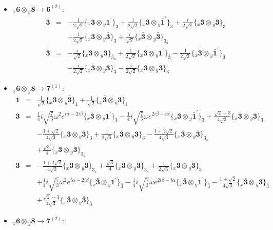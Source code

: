 \documentclass[english]{article}
\newcommand{\rep}[1]{\mathbf{#1}}
\newcommand{\repx}[2]{{}_{#2}\mathbf{#1}}
\newcommand{\subcg}[3]{\big\{ \repx{#1}{x}\otimes\repx{#2}{y}\big\}^{}_{#3}}
\begin{document}
\begin{itemize}
\begin{eqnarray*}
\end{eqnarray*}
\item $\repx{6}{x}\otimes\repx{8}{y}\to\rep{6}^{(2)}$:
\begin{eqnarray*}
\rep{3} &=& -\frac{1}{2 \sqrt{2}}\subcg{3}{1^{\prime}}{3}+\frac{1}{2 \sqrt{2}}\subcg{3}{\bar{1}^{\prime}}{3}+\frac{i}{2 \sqrt{2}}\subcg{3}{3}{3} \\ 
 & & +\frac{i}{2 \sqrt{2}}\subcg{3}{\bar{3}}{3}+\frac{i}{\sqrt{2}}\subcg{\bar{3}}{\bar{3}}{3_{a}}
\\
\rep{\bar{3}} &=& -\frac{i}{\sqrt{2}}\subcg{3}{3}{\bar{3}_{a}}+\frac{1}{2 \sqrt{2}}\subcg{\bar{3}}{1^{\prime}}{\bar{3}}-\frac{1}{2 \sqrt{2}}\subcg{\bar{3}}{\bar{1}^{\prime}}{\bar{3}} \\ 
 & & -\frac{i}{2 \sqrt{2}}\subcg{\bar{3}}{3}{\bar{3}}-\frac{i}{2 \sqrt{2}}\subcg{\bar{3}}{\bar{3}}{\bar{3}}
\end{eqnarray*}
\item $\repx{6}{x}\otimes\repx{8}{y}\to\rep{7}^{(1)}$:
\begin{eqnarray*}
\rep{1} &=& \frac{1}{\sqrt{2}}\subcg{3}{\bar{3}}{1}+\frac{1}{\sqrt{2}}\subcg{\bar{3}}{3}{1}
\\
\rep{3} &=& \frac{1}{4} i \sqrt{\frac{7}{3}} \omega ^2 e^{i \alpha -2 i \beta }\subcg{3}{1^{\prime}}{3}-\frac{1}{4} i \sqrt{\frac{7}{3}} \omega  e^{2 i \beta -i \alpha }\subcg{3}{\bar{1}^{\prime}}{3}+\frac{\sqrt{2}-3}{4 \sqrt{3}}\subcg{3}{3}{3} \\ 
 & & -\frac{1+\sqrt{2}}{4 \sqrt{3}}\subcg{3}{\bar{3}}{3}+\frac{1}{2 \sqrt{6}}\subcg{\bar{3}}{3}{3}-\frac{1+2 \sqrt{2}}{4 \sqrt{3}}\subcg{\bar{3}}{\bar{3}}{3_{s}} \\ 
 & & +\frac{\sqrt{3}}{4}\subcg{\bar{3}}{\bar{3}}{3_{a}}
\\
\rep{\bar{3}} &=& -\frac{1+2 \sqrt{2}}{4 \sqrt{3}}\subcg{3}{3}{\bar{3}_{s}}+\frac{\sqrt{3}}{4}\subcg{3}{3}{\bar{3}_{a}}+\frac{1}{2 \sqrt{6}}\subcg{3}{\bar{3}}{\bar{3}} \\ 
 & & +\frac{1}{4} i \sqrt{\frac{7}{3}} \omega ^2 e^{i \alpha -2 i \beta }\subcg{\bar{3}}{1^{\prime}}{\bar{3}}-\frac{1}{4} i \sqrt{\frac{7}{3}} \omega  e^{2 i \beta -i \alpha }\subcg{\bar{3}}{\bar{1}^{\prime}}{\bar{3}}-\frac{1+\sqrt{2}}{4 \sqrt{3}}\subcg{\bar{3}}{3}{\bar{3}} \\ 
 & & +\frac{\sqrt{2}-3}{4 \sqrt{3}}\subcg{\bar{3}}{\bar{3}}{\bar{3}}
\end{eqnarray*}
\item $\repx{6}{x}\otimes\repx{8}{y}\to\rep{7}^{(2)}$:
\begin{eqnarray*}

\end{eqnarray*}
\end{itemize}
\end{document}
